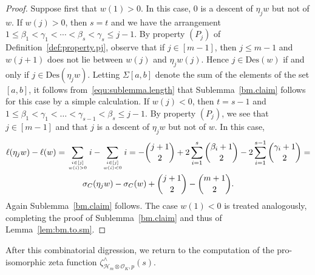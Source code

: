 \documentclass[11pt,a4paper]{amsart}
\theoremstyle{plain}
\theoremstyle{remark}
\newcommand{\tensor}{\otimes}
\begin{document}
\begin{proof}
Suppose first that $w(1) > 0$.  In this case, $0$ is a descent of $\eta_j w$ but not of $w$.  If $w(j) > 0$, then $s = t$ and we have the arrangement
$ 1 \leq \beta_1 < \gamma_1 < \cdots < \beta_s < \gamma_s \leq j - 1$.
By property $(P_j)$ of Definition~\ref{def:property.pj}, observe that if $j \in [m-1]$, then $j \leq m - 1$ and $w(j+1)$ does not lie between $w(j)$ and $\eta_j w (j)$.  Hence $j \in \mathrm{Des}(w)$ if and only if $j \in \mathrm{Des}(\eta_j w)$.  
Letting $\Sigma[a,b]$ denote the sum of the elements of the set $[a,b]$, it follows from~\eqref{equ:sublemma.length} that
Sublemma~\ref{bm.claim} follows for this case by a simple calculation.
If $w(j) < 0$, then $t = s - 1$ and $1 \leq \beta_1 < \gamma_1 < \dots < \gamma_{s-1} < \beta_s \leq j - 1$.  By property $(P_j)$, we see that $j \in [m-1]$ and that $j$ is a descent of $\eta_j w$ but not of $w$.  In this case,
\begin{multline*}
\ell(\eta_j w) - \ell(w) = \sum_{i \in [j] \atop w(i) > 0} i - \sum_{i \in [j] \atop w(i) < 0} i = - \binom{j+1}{2} + 2 \sum_{i = 1}^s \binom{\beta_i + 1}{2} - 2 \sum_{i = 1}^{s-1} \binom{\gamma_i + 1}{2} = \\
\sigma_C(\eta_j w) - \sigma_C(w) + \binom{j+1}{2} - \binom{m+1}{2}.
\end{multline*}
Again Sublemma~\ref{bm.claim} follows.
The case $w(1) < 0$ is treated analogously, completing the proof of Sublemma~\ref{bm.claim} and thus of Lemma~\ref{lem:bm.to.sm}.
\end{proof}

After this combinatorial digression, we return to the computation of the pro-isomorphic zeta function $\zeta^\wedge_{\mathcal{H}_m \tensor \mathcal{O}_K,p}(s)$.
\end{document}
